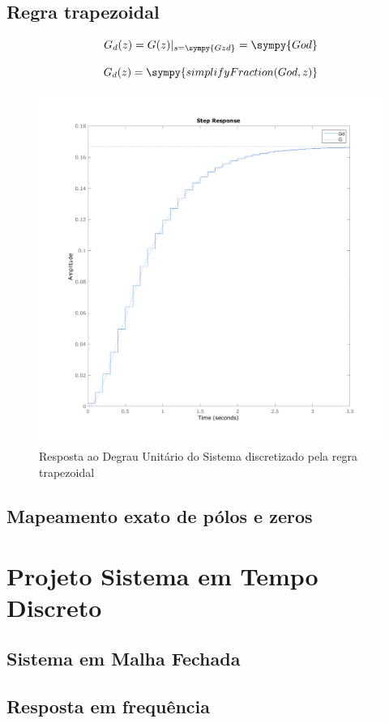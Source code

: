 \documentclass[a4paper,11pt]{article}
\begin{document}
\subsection{Regra trapezoidal}

$$
G_d(z) =  G(z)|_{s = \sympy{Gzd}} = \sympy{God}
$$

\begin{equation}
    G_d(z) = \sympy{simplifyFraction(God,z)}
\end{equation}

\begin{figure}[H]
    \centering
    \includegraphics[width=0.8\linewidth]{img/exsim2-plot-g-trap.png}
    \caption{Resposta ao Degrau Unitário do Sistema discretizado pela regra trapezoidal}
\end{figure}

\subsection{Mapeamento exato de pólos e zeros}


\section{Projeto Sistema em Tempo Discreto}
\subsection{Sistema em Malha Fechada}
\subsection{Resposta em frequência}
\end{document}
